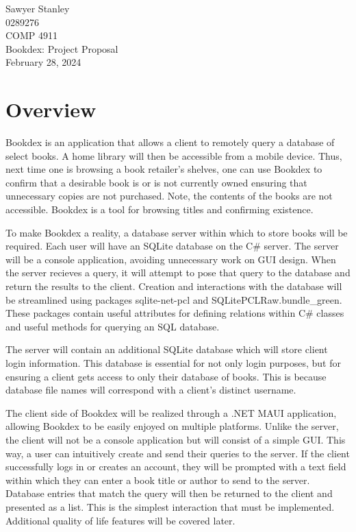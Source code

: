 \documentclass[12pt]{article}
\newcommand{\class}{COMP 4911}
\newcommand{\examnum}{Bookdex: Project Proposal}
\newcommand{\examdate}{February 28, 2024}
\newcommand{\yourname}{Sawyer Stanley}
\newcommand{\studentid}{0289276}
\begin{document}
\pagestyle{plain}

\vspace*{\fill}
\begin{center}
    \yourname\\
    \studentid\\
    \class\\
    \examnum\\
    \examdate\\
\end{center}
\vspace*{\fill}

\thispagestyle{empty}
\newpage

\section*{Overview}
Bookdex is an application that allows a client to remotely query a database of select books. A home library will then be accessible from a mobile device. Thus, next time one is browsing a book retailer's shelves, one can use Bookdex to confirm that a desirable book is or is not currently owned ensuring that unnecessary copies are not purchased. Note, the contents of the books are not accessible. Bookdex is a tool for browsing titles and confirming existence.

To make Bookdex a reality, a database server within which to store books will be required. Each user will have an SQLite database on the C\# server. The server will be a console application, avoiding unnecessary work on GUI design. When the server recieves a query, it will attempt to pose that query to the database and return the results to the client. Creation and interactions with the database will be streamlined using packages sqlite-net-pcl\cite{sqlitenetpcl} and SQLitePCLRaw.bundle\_green\cite{sqlitepclrawbundlegreen}. These packages contain useful attributes for defining relations within C\# classes and useful methods for querying an SQL database.

The server will contain an additional SQLite database which will store client login information. This database is essential for not only login purposes, but for ensuring a client gets access to only their database of books. This is because database file names will correspond with a client's distinct username.

The client side of Bookdex will be realized through a .NET MAUI application\cite{maui}, allowing Bookdex to be easily enjoyed on multiple platforms. Unlike the server, the client will not be a console application but will consist of a simple GUI. This way, a user can intuitively create and send their queries to the server. If the client successfully logs in or creates an account, they will be prompted with a text field within which they can enter a book title or author to send to the server. Database entries that match the query will then be returned to the client and presented as a list. This is the simplest interaction that must be implemented. Additional quality of life features will be covered later.
\end{document}
